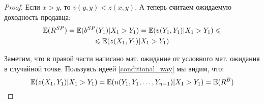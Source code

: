 \begin{proof}
Если $ x>y $, то $ v(y,y)<z(x,y) $. А теперь считаем ожидаемую доходность продавца:
\begin{multline}
\mathbb{E}(R^{SP})=\mathbb{E}(b^{SP}(Y_{1})|X_{1}>Y_{1})=\mathbb{E}(v(Y_{1},Y_{1})|X_{1}>Y_{1})\leqslant\\
\leqslant \mathbb{E}(z(X_{1},Y_{1})|X_{1}>Y_{1})
\end{multline}

Заметим, что в правой части написано мат. ожидание от условного мат. ожидания в случайной точке. Пользуясь идеей \ref{conditional_way} мы видим, что:
\begin{equation}
\mathbb{E}(z(X_{1},Y_{1})|X_{1}>Y_{1})=\mathbb{E}(u(Y_{1},Y_{1},\ldots,Y_{n-1})|X_{1}>Y_{1})=\mathbb{E}(R^{B})
\end{equation}

\end{proof}

